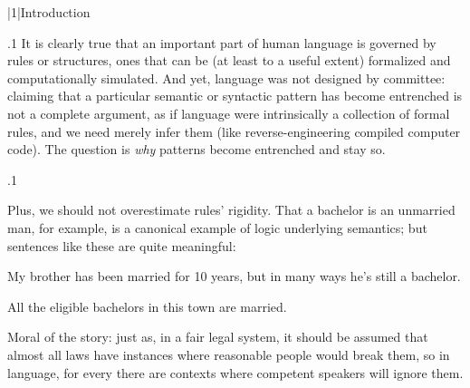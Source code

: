 \documentclass[11pt, twocolumn]{article}
\begin{document}
\begin{abstract}
This paper examines methodological foundations for
linguistics in terms of phenomenology and the
philosophy of science.  I argue for explanatory
paradigms that adequately model the interdependence of
linguistic and extra-linguistic knowledge/faculties
for understanding typical sentences.  In lieu
of set theory or preducate logic formalization, I
point out some similarities between natural and computer
languages, so that formal structures related to
compilers and programming-language implementation
may offer useful simplified models for human
communication.  In particular, I emphasize how
surface discourse may be transformed to sequences
of operations toward conceptual aggregation/synthesis,
while maintaining that most details of how
concepts are pairwise combined, modifying one another,
depend on extra-linguistic cognitive activity.
Situational meaning construal is outside the
scope of linguistics by analogy to how
system kernels and Central Processing Units
are outside the scope of programming language theory.
\end{abstract} 


\s|1|{Introduction}

\p.1{%
It is clearly true that an important part of human language is governed by rules or
structures, ones that can be (at least to a useful extent) formalized and computationally
simulated.  And yet, language was not designed by committee: claiming that a
particular semantic or syntactic pattern has become entrenched is not a
complete argument, as if language were intrinsically a collection of formal rules, and we
need merely infer them (like reverse-engineering compiled computer code).  The
question is \textit{why} patterns become entrenched and stay so.
} %

\p.1{%
Plus, we should not
overestimate rules' rigidity.  That a bachelor is an unmarried man, for example,
is a canonical example of logic underlying semantics; but sentences like
these are quite meaningful:

\begin{exsGroup}

\exsItem{}   My brother has been married for 10 years, but in many ways he's still a bachelor.

\exsItem{}   All the eligible bachelors in this town are married.

\end{exsGroup}

\nip
Moral of the story: just as, in a fair legal system, it should be assumed that
almost all laws have instances where reasonable people would break them, so
in language, for every  there are contexts where competent
speakers will ignore them.
} %
\end{document}
